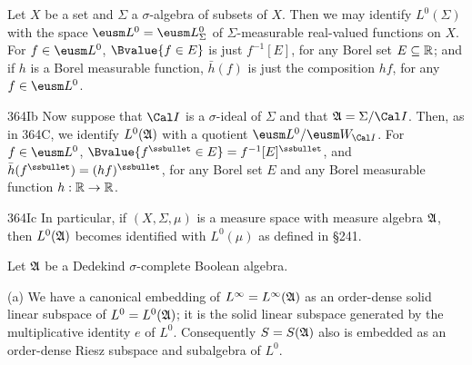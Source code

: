 
  Let $X$ be a set and $\Sigma$ a $\sigma$-algebra of
subsets of $X$.   Then we may identify $L^0(\Sigma)$ with the space
$\eusm L^0=\eusm L^0_{\Sigma}$ of
$\Sigma$-measurable real-valued functions on $X$.
   For
$f\in\eusm L^0$,
$\Bvalue{f\in E}$ is just $f^{-1}[E]$, for any
Borel set $E\subseteq\Bbb R$;  and if $h$ is a Borel measurable
function, $\bar h(f)$ is just the composition $hf$, for
any $f\in\eusm L^0$.

\spheader 364Ib Now suppose that $\Cal I$ is a $\sigma$-ideal of
$\Sigma$ and that $\frak A=\Sigma/\Cal I$.   Then, as in 364C, we
identify $L^0(\frak A)$ with a quotient $\eusm L^0/\eusm W_{\Cal I}$.
For
$f\in\eusm L^0$, $\Bvalue{f^{\ssbullet}\in E}=f^{-1}[E]^{\ssbullet}$,
and $\bar h(f^{\ssbullet})=(hf)^{\ssbullet}$, for any Borel set $E$ and
any Borel measurable function $h:\Bbb R\to\Bbb R$.

\spheader 364Ic In particular, if $(X,\Sigma,\mu)$ is a measure space
with measure algebra $\frak A$, then $L^0(\frak A)$ becomes identified
with $L^0(\mu)$ as defined in \S241.


 Let
$\frak A$ be a Dedekind $\sigma$-complete Boolean algebra.

(a) We have a canonical embedding of $L^{\infty}=L^{\infty}(\frak A)$ as
an order-dense solid linear subspace of $L^0=L^0(\frak A)$;  it is the
solid linear subspace generated by the multiplicative identity $e$ of
$L^0$.   Consequently $S=S(\frak A)$ also is embedded as an order-dense
Riesz subspace and subalgebra of $L^0$.

